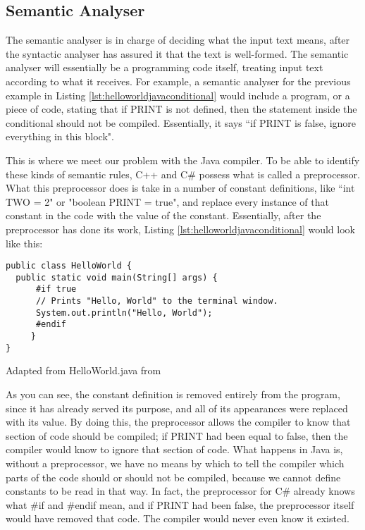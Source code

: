 
\subsection{Semantic Analyser}

The semantic analyser is in charge of deciding what the input text means, after the syntactic analyser has assured it that the text is well-formed. The semantic analyser will essentially be a programming code itself, treating input text according to what it receives. For example, a semantic analyser for the previous example in Listing \ref{lst:helloworldjavaconditional} would include a program, or a piece of code, stating that if PRINT is not defined, then the statement inside the conditional should not be compiled. Essentially, it says ``if PRINT is false, ignore everything in this block".

This is where we meet our problem with the Java compiler. To be able to identify these kinds of semantic rules, C++ and C\# possess what is called a preprocessor. What this preprocessor does is take in a number of constant definitions, like ``int TWO = 2" or "boolean PRINT = true", and replace every instance of that constant in the code with the value of the constant. Essentially, after the preprocessor has done its work, Listing \ref{lst:helloworldjavaconditional} would look like this:

\begin{listing}
\begin{verbatim}
public class HelloWorld {
  public static void main(String[] args) {
      #if true
      // Prints "Hello, World" to the terminal window.
      System.out.println("Hello, World");
      #endif
     }
}
\end{verbatim}
\caption{Adapted from HelloWorld.java from \cite{SEDGEWICK:2011}} \label{lst:helloworldjavaconditional2}
\end{listing}

As you can see, the constant definition is removed entirely from the program, since it has already served its purpose, and all of its appearances were replaced with its value. By doing this, the preprocessor allows the compiler to know that section of code should be compiled; if PRINT had been equal to false, then the compiler would know to ignore that section of code. What happens in Java is, without a preprocessor, we have no means by which to tell the compiler which parts of the code should or should not be compiled, because we cannot define constants to be read in that way. In fact, the preprocessor for C\# already knows what \#if and \#endif mean, and if PRINT had been false, the preprocessor itself would have removed that code. The compiler would never even know it existed.

